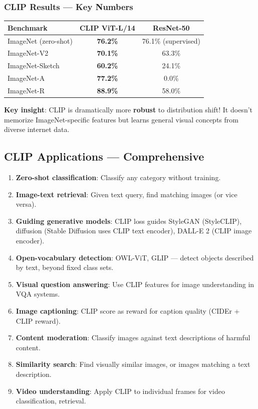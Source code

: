 \subsubsection{CLIP Results — Key Numbers}
\begin{center}\small
\begin{tabular}{lcc}\toprule
\textbf{Benchmark} & \textbf{CLIP ViT-L/14} & \textbf{ResNet-50} \\\midrule
ImageNet (zero-shot) & \textbf{76.2\%} & 76.1\% (supervised) \\
ImageNet-V2 & \textbf{70.1\%} & 63.3\% \\
ImageNet-Sketch & \textbf{60.2\%} & 24.1\% \\
ImageNet-A & \textbf{77.2\%} & 0.0\% \\
ImageNet-R & \textbf{88.9\%} & 58.0\% \\
\bottomrule
\end{tabular}
\end{center}
\textbf{Key insight}: CLIP is dramatically more \textbf{robust} to distribution shift! It doesn't memorize ImageNet-specific features but learns general visual concepts from diverse internet data.

\subsection{CLIP Applications — Comprehensive}
\begin{enumerate}
\item \textbf{Zero-shot classification}: Classify any category without training.
\item \textbf{Image-text retrieval}: Given text query, find matching images (or vice versa).
\item \textbf{Guiding generative models}: CLIP loss guides StyleGAN (StyleCLIP), diffusion (Stable Diffusion uses CLIP text encoder), DALL-E 2 (CLIP image encoder).
\item \textbf{Open-vocabulary detection}: OWL-ViT, GLIP — detect objects described by text, beyond fixed class sets.
\item \textbf{Visual question answering}: Use CLIP features for image understanding in VQA systems.
\item \textbf{Image captioning}: CLIP score as reward for caption quality (CIDEr + CLIP reward).
\item \textbf{Content moderation}: Classify images against text descriptions of harmful content.
\item \textbf{Similarity search}: Find visually similar images, or images matching a text description.
\item \textbf{Video understanding}: Apply CLIP to individual frames for video classification, retrieval.
\end{enumerate}

